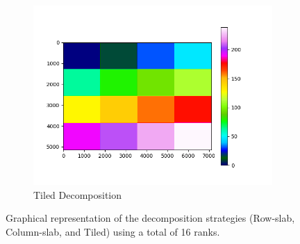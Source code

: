 \begin{figure}[h]
\begin{subfigure}{0.3\textwidth}
        \centering
        \includegraphics[width=\textwidth]{images/tiled.png}
        \caption{Tiled Decomposition}
        \label{fig:tiled}
    \end{subfigure}
    \caption{Graphical representation of the decomposition strategies (Row-slab, Column-slab, and Tiled) using a total of 16 ranks.}
    \label{fig:decomposition-methods}
\end{figure}